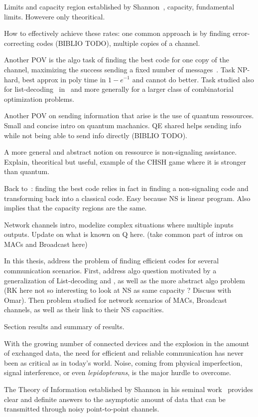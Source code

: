 
Limits and capacity region established by Shannon~\cite{Shannon48}, capacity, fundamental limits. Howevere only theoritical.

How to effectively achieve these rates: one common approach is by finding error-correcting codes (BIBLIO TODO), multiple copies of a channel.

Another POV is the algo task of finding the best code for one copy of the channel, maximizing the success sending a fixed number of messages~\cite{BF18}. Task NP-hard, best approx in poly time in $1-e^{-1}$ and cannot do better. Task studied also for list-decoding~\cite{Elias57,Wozencraft58} in~\cite{BFGG20} and more generally for a larger class of combinatorial optimization problems.

Another POV on sending information that arise is the use of quantum ressources. Small and concise intro on quantum machanics. QE shared helps sending info while not being able to send info directly (BIBLIO TODO).

A more general and abstract notion on ressource is non-signaling assistance. Explain, theoritical but useful, example of the CHSH game where it is stronger than quantum.

Back to~\cite{BF18}: finding the best code relies in fact in finding a non-signaling code and transforming back into a classical code. Easy because NS is linear program. Also implies that the capacity regions are the same.

Network channels intro, modelize complex situations where multiple inputs outputs. Update on what is known on Q here. (take common part of intros on MACs and Broadcast here)

In this thesis, address the problem of finding efficient codes for several communication scenarios. First, address algo question motivated by a generalization of List-decoding and \cite{BFGG20}, as well as the more abstract algo problem (RK here not so interesting to look at NS as same capacity ? Discuss with Omar). Then problem studied for network scenarios of MACs, Broadcast channels, as well as their link to their NS capacities.

Section results and summary of results.


\newpage

With the growing number of connected devices and the explosion in the amount of exchanged data, the need for efficient and reliable communication has never been as critical as in today's world. Noise, coming from physical imperfection, signal interference, or even \emph{lepidopterans}, is the major hurdle to overcome.

The Theory of Information established by Shannon in his seminal work~\cite{Shannon48} provides clear and definite answers to the asymptotic amount of data that can be transmitted through noisy point-to-point channels.
